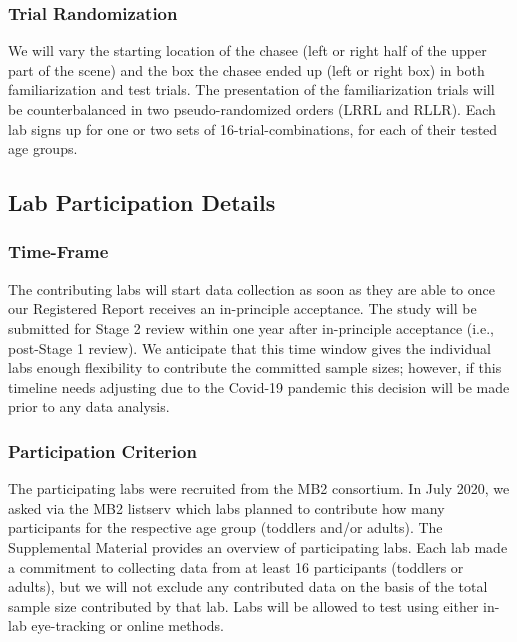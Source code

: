 \documentclass[
  man,floatsintext]{apa6}
\begin{document}
\subsubsection{Trial Randomization}\label{trial-randomization}

We will vary the starting location of the chasee (left or right half of the upper part of the scene) and the box the chasee ended up (left or right box) in both familiarization and test trials. The presentation of the familiarization trials will be counterbalanced in two pseudo-randomized orders (LRRL and RLLR). Each lab signs up for one or two sets of 16-trial-combinations, for each of their tested age groups.

\subsection{Lab Participation Details}\label{lab-participation-details}

\subsubsection{Time-Frame}\label{time-frame}

The contributing labs will start data collection as soon as they are able to once our Registered Report receives an in-principle acceptance. The study will be submitted for Stage 2 review within one year after in-principle acceptance (i.e., post-Stage 1 review). We anticipate that this time window gives the individual labs enough flexibility to contribute the committed sample sizes; however, if this timeline needs adjusting due to the Covid-19 pandemic this decision will be made prior to any data analysis.

\subsubsection{Participation Criterion}\label{participation-criterion}

The participating labs were recruited from the MB2 consortium. In July 2020, we asked via the MB2 listserv which labs planned to contribute how many participants for the respective age group (toddlers and/or adults). The Supplemental Material provides an overview of participating labs. Each lab made a commitment to collecting data from at least 16 participants (toddlers or adults), but we will not exclude any contributed data on the basis of the total sample size contributed by that lab. Labs will be allowed to test using either in-lab eye-tracking or online methods.
\end{document}
